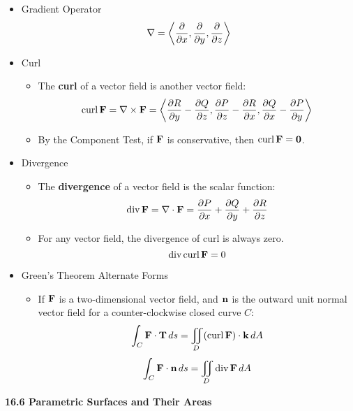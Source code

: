   \begin{itemize}
    \item Gradient Operator
      \[
        \nabla = \left<\frac{\partial}{\partial x},\frac{\partial}{\partial y},\frac{\partial}{\partial z}\right>
      \]

    \item Curl
      \begin{itemize}
        \item The \textbf{curl} of a vector field is another vector field:
          \[
            \textrm{curl}\,\mathbf{F} = \nabla \times \mathbf{F} = \left<\frac{\partial R}{\partial y}-\frac{\partial Q}{\partial z},\frac{\partial P}{\partial z}-\frac{\partial R}{\partial x},\frac{\partial Q}{\partial x}-\frac{\partial P}{\partial y}\right>
          \]
        \item By the Component Test, if $\mathbf{F}$ is conservative, then $\textrm{curl}\,\mathbf{F}=\mathbf{0}$.
      \end{itemize} 

    \item Divergence
      \begin{itemize}
        \item The \textbf{divergence} of a vector field is the scalar function:
          \[
            \textrm{div}\,\mathbf{F} = \nabla\cdot\mathbf{F} = \frac{\partial P}{\partial x}+\frac{\partial Q}{\partial y}+\frac{\partial R}{\partial z}
          \]
        \item For any vector field, the divergence of curl is always zero.
          \[
            \textrm{div}\,\textrm{curl}\,\mathbf{F} = 0
          \]
      \end{itemize}

      \item Green's Theorem Alternate Forms
        \begin{itemize}
          \item If $\mathbf{F}$ is a two-dimensional vector field, and $\mathbf{n}$ is the outward unit normal vector field for a counter-clockwise closed curve $C$:
            \[
              \int_C \mathbf{F}\cdot\mathbf{T}\,d{s} = \iint_D (\textrm{curl}\,\mathbf{F}) \cdot \mathbf{k} \,d{A}
            \]
            \[
              \int_C \mathbf{F}\cdot\mathbf{n}\,d{s} = \iint_D \textrm{div}\,\mathbf{F} \,d{A}
            \]
        \end{itemize}

  \end{itemize}

\newpage

\centerline{\bf 16.6 Parametric Surfaces and Their Areas}

